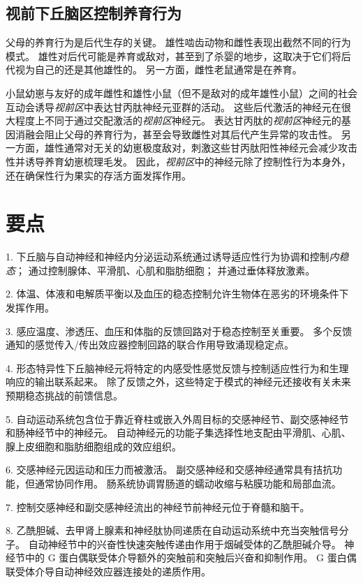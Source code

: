 \subsection{视前下丘脑区控制养育行为}

父母的养育行为是后代生存的关键。
雄性啮齿动物和雌性表现出截然不同的行为模式。
雄性对后代可能是养育或敌对，甚至到了杀婴的地步，这取决于它们将后代视为自己的还是其他雄性的。
另一方面，雌性老鼠通常是在养育。


小鼠幼崽与友好的成年雌性和雄性小鼠（但不是敌对的成年雄性小鼠）之间的社会互动会诱导\textit{视前区}中表达甘丙肽神经元亚群的活动。
这些后代激活的神经元在很大程度上不同于通过交配激活的\textit{视前区}神经元。
表达甘丙肽的\textit{视前区}神经元的基因消融会阻止父母的养育行为，甚至会导致雌性对其后代产生异常的攻击性。
另一方面，雄性通常对无关的幼崽极度敌对，刺激这些甘丙肽阳性神经元会减少攻击性并诱导养育幼崽梳理毛发。
因此，\textit{视前区}中的神经元除了控制性行为本身外，还在确保性行为果实的存活方面发挥作用。



\section{要点}

1. 下丘脑与自动神经和神经内分泌运动系统通过诱导适应性行为协调和控制\textit{内稳态}；
通过控制腺体、平滑肌、心肌和脂肪细胞；
并通过垂体释放激素。 


2. 体温、体液和电解质平衡以及血压的稳态控制允许生物体在恶劣的环境条件下发挥作用。


3. 感应温度、渗透压、血压和体脂的反馈回路对于稳态控制至关重要。
多个反馈通知的感觉传入/传出效应器控制回路的联合作用导致涌现稳定点。


4. 形态特异性下丘脑神经元将特定的内感受性感觉反馈与控制适应性行为和生理响应的输出联系起来。
除了反馈之外，这些特定于模式的神经元还接收有关未来预期稳态挑战的前馈信息。


5. 自动运动系统包含位于靠近脊柱或嵌入外周目标的交感神经节、副交感神经节和肠神经节中的神经元。
自动神经元的功能子集选择性地支配由平滑肌、心肌、腺上皮细胞和脂肪细胞组成的效应组织。


6. 交感神经元因运动和压力而被激活。
副交感神经和交感神经通常具有拮抗功能，但通常协同作用。
肠系统协调胃肠道的蠕动收缩与粘膜功能和局部血流。


7. 控制交感神经和副交感神经流出的神经节前神经元位于脊髓和脑干。


8. 乙酰胆碱、去甲肾上腺素和神经肽协同递质在自动运动系统中充当突触信号分子。
自动神经节中的兴奋性快速突触传递由作用于烟碱受体的乙酰胆碱介导。
神经节中的 G 蛋白偶联受体介导额外的突触前和突触后兴奋和抑制作用。
G 蛋白偶联受体介导自动神经效应器连接处的递质作用。


